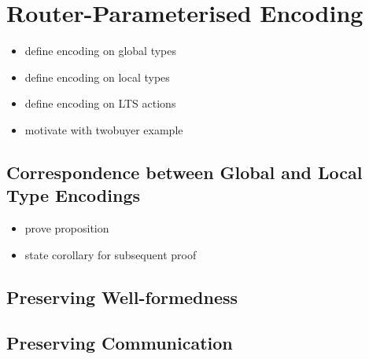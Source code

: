\section{Router-Parameterised Encoding}
\label{section:encoding}

\begin{itemize}
\item define encoding on global types
\item define encoding on local types
\item define encoding on LTS actions
\item motivate with twobuyer example
\end{itemize}

\subsection{Correspondence between Global and Local Type Encodings}
\label{subsection:encodelink}
\begin{itemize}
\item prove proposition
\item state corollary for subsequent proof
\end{itemize}

\subsection{Preserving Well-formedness}
\label{subsection:encodepreservewf}

\subsection{Preserving Communication}
\label{subsection:encodepreservecomm}